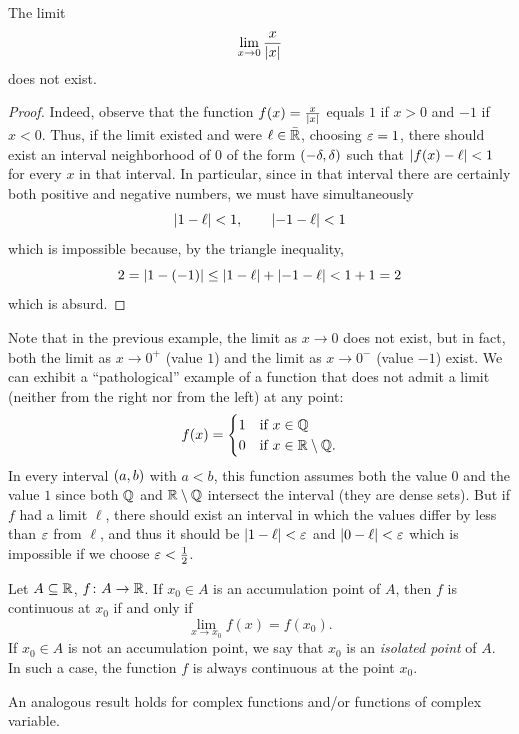 \begin{example}
The limit 
\[
  \lim_{x\to 0} \frac{x}{{\left|x\right|}}
\]
does not exist. 
\end{example}
\begin{proof}
Indeed, observe that the function $f(x) = \frac{x}{{\left|x\right|}}$ 
equals $1$ if $x>0$ and $-1$ if $x<0$.
Thus, if the limit existed and were $\ell\in \bar {{\mathbb R}}$, 
choosing $\varepsilon=1$, there should exist an interval neighborhood of $0$ 
of the form $\left(-\delta,\delta\right)$ such that 
${\left|f(x)-\ell\right|}<1$ for every $x$ in that interval.
In particular, since in that interval there are certainly 
both positive and negative numbers, we must have 
simultaneously
\[
  {\left|1-\ell\right|}<1, \qquad 
  {\left|-1-\ell\right|}<1  
\]
which is impossible because, by the triangle inequality, 
\[
 2 = {\left|1-(-1)\right|} 
 \le {\left|1-\ell\right|} + {\left|-1-\ell\right|}
 < 1 + 1 = 2
\]
which is absurd.
\end{proof}

Note that in the previous example, the limit as $x\to 0$ 
does not exist, but in fact, both the limit as $x\to 0^+$ 
(value $1$) and the limit as $x\to 0^-$ (value $-1$) exist.
We can exhibit a ``pathological'' example of a function 
that does not admit a limit (neither from the right nor from the left)
at any point:
\[
  f(x) = 
  \begin{cases}
     1 & \text{if $x\in {\mathbb Q}$}\\ 
     0 & \text{if $x\in {\mathbb R}\setminus {\mathbb Q}$}.
  \end{cases}
\]
In every interval $\left(a,b\right)$ with $a<b$, this function 
assumes both the value $0$ and the value $1$ 
since both ${\mathbb Q}$ and ${\mathbb R}\setminus {\mathbb Q}$ intersect 
the interval (they are dense sets).
But if $f$ had a limit $\ell$, there should exist an interval 
in which the values differ by less than $\varepsilon$ from $\ell$, and thus 
it should be ${\left|1-\ell\right|}<\varepsilon$ and ${\left|0-\ell\right|}<\varepsilon$
which is impossible if we choose $\varepsilon < \frac 1 2$.

\begin{theorem}%
\mymark{***}%
  Let $A\subseteq {\mathbb R}$, $f\colon A \to {\mathbb R}$. 
  If $x_0\in A$ is an accumulation point of $A$,
  then $f$ is continuous at $x_0$ if and only if
  \[
    \lim_{x\to x_0}f(x) = f(x_0).
  \]
  If $x_0\in A$ is not an accumulation point, we say 
  that $x_0$ is an \emph{isolated point}%
%
 of $A$.
  In such a case, the function $f$ is always continuous at the point $x_0$.

An analogous result holds for complex functions and/or functions of complex
variable.
\end{theorem}
  
